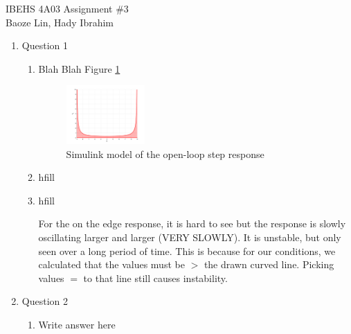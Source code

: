 \documentclass[12pt]{article}
\begin{document}
IBEHS 4A03 \hfill Assignment \#3\\
Baoze Lin, Hady Ibrahim

\hrulefill

\renewcommand{\theenumii}{\arabic{enumi}.\arabic{enumii}}

\begin{enumerate}
\item Question 1
  \begin{enumerate}
    \item
    Blah Blah Figure \ref{fig:figure1_1}
    
    \begin{figure}[H]
      \centering
      \includegraphics[width=0.3\textwidth]{Figures/figure1-2a.png}
      \caption{Simulink model of the open-loop step response}
      \label{fig:figure1_1}
    \end{figure}

    \item hfill
    
    \item hfill
    
    For the on the edge response, it is hard to see but the response is slowly oscillating larger and larger (VERY SLOWLY). It is unstable, but only seen over a long period of time. This is because for our conditions, we calculated that the values must be $>$ the drawn curved line. Picking values $=$ to that line still causes instability.

  \end{enumerate}

\clearpage
\item Question 2
  \begin{enumerate}
    \item Write answer here
     
  \end{enumerate}

\end{enumerate}
\end{document}
